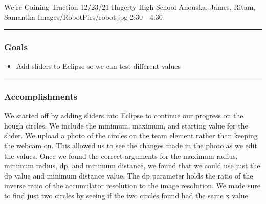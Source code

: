 \insertmeeting 
	{We're Gaining Traction} 
	{12/23/21} 
	{Hagerty High School}
	{Anouska, James, Ritam, Samantha}
	{Images/RobotPics/robot.jpg}
	{2:30 - 4:30}
	
\noindent\hfil\rule{\textwidth}{.4pt}\hfil
\subsubsection*{Goals}
\begin{itemize}
    \item Add sliders to Eclipse so we can test different values  

\end{itemize} 

\noindent\hfil\rule{\textwidth}{.4pt}\hfil

\subsubsection*{Accomplishments}
We started off by adding sliders into Eclipse to continue our progress on the hough circles. We include the minimum, maximum, and starting value for the slider. We upload a photo of the circles on the team element rather than keeping the webcam on. This allowed us to see the changes made in the photo as we edit the values. Once we found the correct arguments for the maximum radius, minimum radius, dp, and minimum distance, we found that we could use just the dp value and minimum distance value. The dp parameter holds the ratio of the inverse ratio of the accumulator resolution to the image resolution. We made sure to find just two circles by seeing if the two circles found had the same x value. 
 




